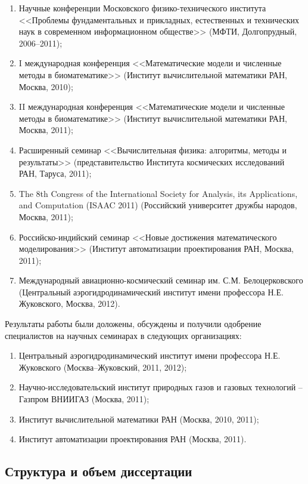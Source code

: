 \begin{enumerate}
\item Научные конференции Московского физико-технического института <<Проблемы фундаментальных и прикладных, естественных и технических наук в современном информационном обществе>> (МФТИ, Долгопрудный, 2006--2011);
\item I международная конференция <<Математические модели и численные методы в биоматематике>> (Институт вычислительной математики РАН, Москва, 2010);
\item II международная конференция <<Математические модели и численные методы в биоматематике>> (Институт вычислительной математики РАН, Москва, 2011);
\item Расширенный семинар <<Вычислительная физика: алгоритмы, методы и результаты>> (представительство Института космических исследований РАН, Таруса, 2011);
\item The 8th Congress of the International Society for Analysis, its Applications, and Computation (ISAAC 2011) (Российский университет дружбы народов, Москва, 2011);
\item Российско-индийский семинар <<Новые достижения математического моделирования>> (Институт автоматизации проектирования РАН, Москва, 2011);
\item Международный авиационно-космический семинар им. С.М. Белоцерковского (Центральный аэрогидродинамический институт имени профессора Н.Е. Жуковского, Москва, 2012).
\end{enumerate}

Результаты работы были доложены, обсуждены и получили одобрение специалистов на научных семинарах в следующих организациях:
\begin{enumerate}
\item Центральный аэрогидродинамический институт имени профессора Н.Е. Жуковского (Москва--Жуковский, 2011, 2012);
\item Научно-исследовательский институт природных газов и газовых технологий – Газпром ВНИИГАЗ (Москва, 2011);
\item Институт вычислительной математики РАН (Москва, 2010, 2011);
\item Институт автоматизации проектирования РАН (Москва, 2011).
\end{enumerate}

\subsection*{Структура и объем диссертации}

